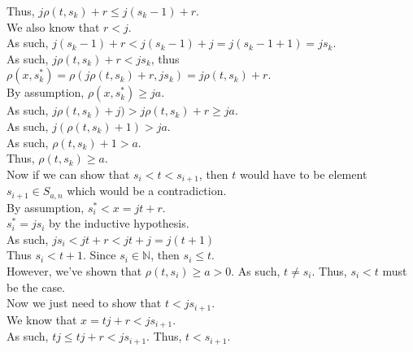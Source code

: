 \documentclass[a4paper,12pt]{article}
\begin{document}
\noindent Thus, $j \rho(t, s_k) + r \leq j(s_k - 1) + r$.\\

\noindent We also know that $r < j$.\\

\noindent As such, $j(s_k - 1) + r < j(s_k - 1) + j = j(s_k - 1 + 1) = js_k$.\\

\noindent As such, $j \rho(t, s_k) + r < js_k$, thus $\rho(x, s^*_k) = \rho(j \rho(t, s_k) + r, js_k) = j \rho(t, s_k) + r$.\\

\noindent By assumption, $\rho(x, s^*_k) \geq ja$.\\

\noindent As such, $j \rho(t, s_k) + j) > j \rho(t, s_k) + r \geq ja$.\\

\noindent As such, $j(\rho(t, s_k) + 1) > ja$.\\

\noindent As such, $\rho(t, s_k) + 1 > a$.\\

\noindent Thus, $\rho(t, s_k) \geq a$.\\

\noindent Now if we can show that $s_i < t < s_{i+1}$, then $t$ would have to be element $s_{i + 1} \in S_{a, n}$ which would be a contradiction.\\

\noindent By assumption, $s^*_i < x = jt + r$.\\

\noindent $s^*_i = js_i$ by the inductive hypothesis.\\

\noindent As such, $js_i < jt + r < jt + j = j(t + 1)$\\

\noindent Thus $s_i < t + 1$. Since $s_i \in \mathbb{N}$, then $s_i \leq t$.\\

\noindent However, we've shown that $\rho(t, s_i) \geq a > 0$. As such, $t \neq s_i$. Thus, $s_i < t$ must be the case.\\

\noindent Now we just need to show that $t < js_{i + 1}$.\\

\noindent We know that $x = tj + r < js_{i+1}$.\\

\noindent As such, $tj \leq tj + r < js_{i+1}$. Thus, $t < s_{i + 1}$.\\
\end{document}
